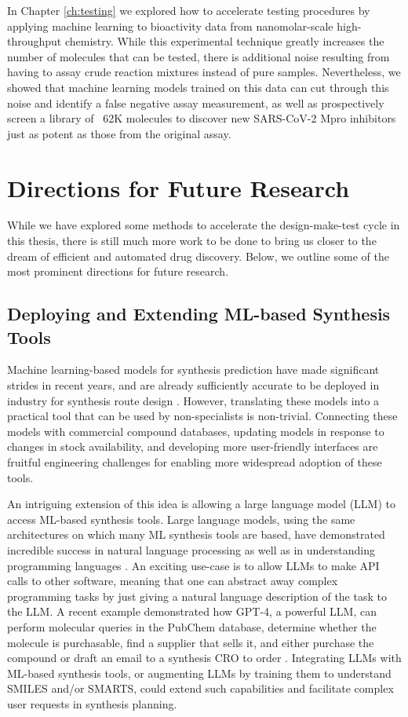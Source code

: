 In Chapter \ref{ch:testing} we explored how to accelerate testing procedures by applying machine learning to bioactivity data from nanomolar-scale high-throughput chemistry. While this experimental technique greatly increases the number of molecules that can be tested, there is additional noise resulting from having to assay crude reaction mixtures instead of pure samples. Nevertheless, we showed that machine learning models trained on this data can cut through this noise and identify a false negative assay measurement, as well as prospectively screen a library of ~62K molecules to discover new SARS-CoV-2 Mpro inhibitors just as potent as those from the original assay.

\section{Directions for Future Research}

While we have explored some methods to accelerate the design-make-test cycle in this thesis, there is still much more work to be done to bring us closer to the dream of efficient and automated drug discovery. Below, we outline some of the most prominent directions for future research.

\subsection{Deploying and Extending ML-based Synthesis Tools}
Machine learning-based models for synthesis prediction have made significant strides in recent years, and are already sufficiently accurate to be deployed in industry for synthesis route design \cite{Tu2023deployment}. However, translating these models into a practical tool that can be used by non-specialists is non-trivial. Connecting these models with commercial compound databases, updating models in response to changes in stock availability, and developing more user-friendly interfaces are fruitful engineering challenges for enabling more widespread adoption of these tools.

An intriguing extension of this idea is allowing a large language model (LLM) to access ML-based synthesis tools. Large language models, using the same architectures on which many ML synthesis tools are based, have demonstrated incredible success in natural language processing as well as in understanding programming languages \cite{OpenAI2021GPT3, Chowdhery2022Palm, Touvron2023Llama}. An exciting use-case is to allow LLMs to make API calls to other software, meaning that one can abstract away complex programming tasks by just giving a natural language description of the task to the LLM. A recent example demonstrated how GPT-4, a powerful LLM, can perform molecular queries in the PubChem database, determine whether the molecule is purchasable, find a supplier that sells it, and either purchase the compound or draft an email to a synthesis CRO to order \cite{OpenAI2023GPT4}. Integrating LLMs with ML-based synthesis tools, or augmenting LLMs by training them to understand SMILES and/or SMARTS, could extend such capabilities and facilitate complex user requests in synthesis planning.

